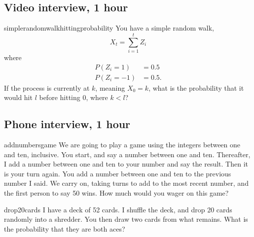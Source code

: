 \documentclass[a4paper]{article}
\begin{document}
\subsection{Video interview, 1 hour}
\begin{question}{simplerandomwalkhittingprobability}
You have a simple random walk,
\[
  X_t = \sum_{i=1}^{t}{Z_i}
\]
where
\begin{align*}
 P(Z_i =  1) &= 0.5 \\
 P(Z_i = -1) &= 0.5
 \text{.}
\end{align*}
If the process is currently at $k$, meaning $X_0=k$, what is the probability that it would hit $l$ before hitting $0$,
where $k < l$?
\end{question}

\clearpage




\clearpage
\subsection{Phone interview, 1 hour}
\begin{question}{addnumbersgame}
We are going to play a game using the integers between one and ten, inclusive.
You start, and say a number between one and ten.
Thereafter, I add a number between one and ten to your number and say the result.
Then it is your turn again.
You add a number between one and ten to the previous number I said.
We carry on, taking turns to add to the most recent number, and the first person to say 50 wins.
How much would you wager on this game?
\end{question}


\begin{question}{drop20cards}
I have a deck of 52 cards.
I shuffle the deck, and drop 20 cards randomly into a shredder.
You then draw two cards from what remains.
What is the probability that they are both aces?
\end{question}


\clearpage



\clearpage
\end{document}
